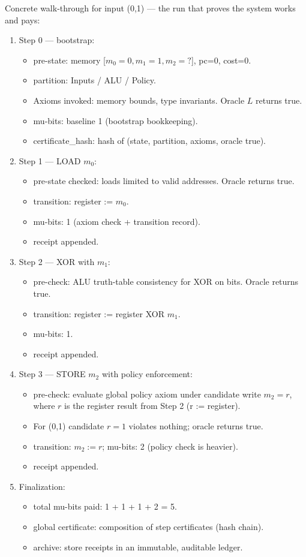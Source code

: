 \documentclass[11pt]{article}
\begin{document}
Concrete walk-through for input (0,1) — the run that proves the system works and pays:
\begin{enumerate}
  \item Step 0 — bootstrap:
    \begin{itemize}
      \item pre-state: memory [$m_0=0,m_1=1,m_2=?$], pc=0, cost=0.
      \item partition: Inputs / ALU / Policy.
      \item Axioms invoked: memory bounds, type invariants. Oracle $L$ returns true.
      \item mu-bits: baseline 1 (bootstrap bookkeeping).
      \item certificate_hash: hash of (state, partition, axioms, oracle true).
    \end{itemize}
  \item Step 1 — LOAD $m_0$:
    \begin{itemize}
      \item pre-state checked: loads limited to valid addresses. Oracle returns true.
      \item transition: register := $m_0$.
      \item mu-bits: 1 (axiom check + transition record).
      \item receipt appended.
    \end{itemize}
  \item Step 2 — XOR with $m_1$:
    \begin{itemize}
      \item pre-check: ALU truth-table consistency for XOR on bits. Oracle returns true.
      \item transition: register := register XOR $m_1$.
      \item mu-bits: 1.
      \item receipt appended.
    \end{itemize}
  \item Step 3 — STORE $m_2$ with policy enforcement:
    \begin{itemize}
      \item pre-check: evaluate global policy axiom under candidate write $m_2 = r$, where $r$ is the register result from Step 2 (r := register).
      \item For (0,1) candidate $r=1$ violates nothing; oracle returns true.
      \item transition: $m_2 := r$; mu-bits: 2 (policy check is heavier).
      \item receipt appended.
    \end{itemize}
  \item Finalization:
    \begin{itemize}
      \item total mu-bits paid: 1 + 1 + 1 + 2 = 5.
      \item global certificate: composition of step certificates (hash chain).
      \item archive: store receipts in an immutable, auditable ledger.
    \end{itemize}
\end{enumerate}
\end{document}
